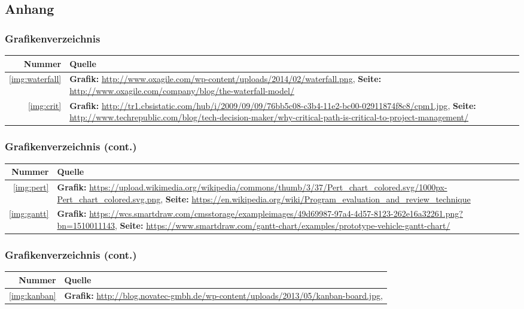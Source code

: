 \documentclass[%
	handout
]{beamer}
\begin{document}
	\subsection{Anhang}
		\begin{frame}
			\frametitle{Grafikenverzeichnis}
			\begin{tabular}{r|p{}}
				\textbf{Nummer}		&	\textbf{Quelle}	\\ \hline
		
				\ref{img:waterfall}	&	\textbf{Grafik:} \url{http://www.oxagile.com/wp-content/uploads/2014/02/waterfall.png},
										\textbf{Seite:} \url{http://www.oxagile.com/company/blog/the-waterfall-model/}	\\\hline
				\ref{img:crit}		&	\textbf{Grafik:} \url{http://tr1.cbsistatic.com/hub/i/2009/09/09/76bb5c08-c3b4-11e2-bc00-02911874f8c8/cpm1.jpg},
										\textbf{Seite:} \url{http://www.techrepublic.com/blog/tech-decision-maker/why-critical-path-is-critical-to-project-management/}
			\end{tabular}
		\end{frame}
		\begin{frame}
			\frametitle{Grafikenverzeichnis (cont.)}
			\begin{tabular}{r|p{.85\textwidth}}
				\textbf{Nummer}		&	\textbf{Quelle}	\\ \hline
				\ref{img:pert}		&	\textbf{Grafik:} \url{https://upload.wikimedia.org/wikipedia/commons/thumb/3/37/Pert_chart_colored.svg/1000px-Pert_chart_colored.svg.png},
										\textbf{Seite:}	 \url{https://en.wikipedia.org/wiki/Program_evaluation_and_review_technique}\\\hline
				\ref{img:gantt}		&	\textbf{Grafik:} \url{https://wcs.smartdraw.com/cmsstorage/exampleimages/49d69987-97a4-4d57-8123-262e16a32261.png?bn=1510011143},
										\textbf{Seite:} \url{https://www.smartdraw.com/gantt-chart/examples/prototype-vehicle-gantt-chart/}
			\end{tabular}
		\end{frame}
		\begin{frame}
			\frametitle{Grafikenverzeichnis (cont.)}
			\begin{tabular}{r|p{}}
				\textbf{Nummer}		&	\textbf{Quelle}	\\ \hline
				\ref{img:kanban}	&	\textbf{Grafik:} \url{http://blog.novatec-gmbh.de/wp-content/uploads/2013/05/kanban-board.jpg}, 
		
			\end{tabular}
		\end{frame}
\end{document}

